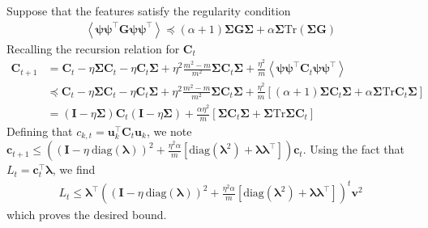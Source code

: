 \documentclass{article} %
\def\I{\mathbf I}
\def\C{\mathbf C}
\begin{document}
Suppose that the features satisfy the regularity condition 
\begin{align}
    \left< \bm \psi \bm\psi^\top \bm G \bm\psi \bm\psi^\top \right> \preceq (\alpha+1)\bm\Sigma \bm G \bm\Sigma + \alpha \bm\Sigma \text{Tr}\left(\bm\Sigma \bm G \right)
\end{align}
%
Recalling the recursion relation for $\bm C_t$
\begin{align}
    \C_{t+1} &= \C_t - \eta \bm\Sigma\C_t - \eta \C_t \bm\Sigma + \eta^2 \frac{m^2-m}{m^2} \bm\Sigma \C_t \bm\Sigma + \frac{\eta^2}{m} \left< \bm\psi \bm\psi^\top \C_t \bm\psi \bm\psi^\top \right>  \nonumber  
    \\
    &\preceq \bm C_t - \eta \bm\Sigma\C_t - \eta \C_t \bm\Sigma + \eta^2 \frac{m^2-m}{m^2} \bm\Sigma \C_t \bm\Sigma + \frac{\eta^2}{m} \left[ (\alpha+1) \bm\Sigma \C_t \bm\Sigma + \alpha \bm\Sigma \text{Tr}\C_t \bm\Sigma \right]  
    \\
    &= (\I - \eta\bm\Sigma) \C_t (\I - \eta \bm\Sigma) + \frac{\alpha \eta^2}{m} \left[ \bm\Sigma \C_t \bm\Sigma + \bm\Sigma \text{Tr}\bm\Sigma\C_t \right]
\end{align}
Defining that $c_{k,t} = \bm u_k^\top \C_t \bm u_k$, we note $\bm c_{t+1} \leq \left( (\bm I - \eta \ \text{diag}(\bm\lambda))^2 + \frac{\eta^2 \alpha}{m}\left[ \text{diag}(\bm\lambda^2) + \bm\lambda\bm\lambda^\top \right] \right) \bm c_t$. Using the fact that $L_t = \bm c_t^\top \bm\lambda$, we find
\begin{align}
    L_t \leq \bm\lambda^\top \left( (\bm I - \eta \ \text{diag}(\bm\lambda))^2 + \frac{\eta^2 \alpha}{m}\left[ \text{diag}(\bm\lambda^2) + \bm\lambda\bm\lambda^\top \right] \right)^t \bm v^2
\end{align}
which proves the desired bound.
\end{document}
